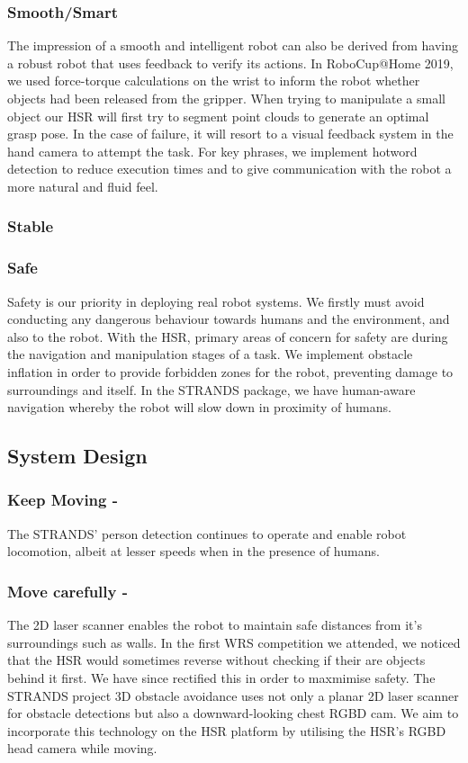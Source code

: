 \documentclass[runningheads,a4paper]{llncs}
\begin{document}
\subsubsection{Smooth/Smart}
The impression of a smooth and intelligent robot can also be derived from having a robust robot that uses feedback to verify its actions. In RoboCup@Home 2019, we used force-torque calculations on the wrist to inform the robot whether objects had been released from the gripper. When trying to manipulate a small object our HSR will first try to segment point clouds to generate an optimal grasp pose. In the case of failure, it will resort to a visual feedback system in the hand camera to attempt the task. For key phrases, we implement hotword detection to reduce execution times and to give communication with the robot a more natural and fluid feel. 

\subsubsection{Stable}


\subsubsection{Safe}
Safety is our priority in deploying real robot systems. We firstly must avoid conducting any dangerous behaviour towards humans and the environment, and also to the robot. With the HSR, primary areas of concern for safety are during the navigation and manipulation stages of a task. We implement obstacle inflation in order to provide forbidden zones for the robot, preventing damage to surroundings and itself. In the STRANDS package, we have human-aware navigation whereby the robot will slow down in proximity of humans. 

\subsection{System Design}
\subsubsection{Keep Moving - }
The STRANDS' person detection continues to operate and enable robot locomotion, albeit at lesser speeds when in the presence of humans.

\subsubsection{Move carefully - }
The 2D laser scanner enables the robot to maintain safe distances from it's surroundings such as walls. In the first WRS competition we attended, we noticed that the HSR would sometimes reverse without checking if their are objects behind it first. We have since rectified this in order to maxmimise safety. The STRANDS project 3D obstacle avoidance uses not only a planar 2D laser scanner for obstacle detections but also a downward-looking chest RGBD cam. We aim to incorporate this technology on the HSR platform by utilising the HSR's RGBD head camera while moving. 
\end{document}
